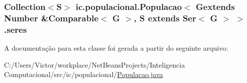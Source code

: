 \hypertarget{classic_1_1populacional_1_1_populacao_3_01_gextends_01_number_01_6_comparable_3_01_g_01_4_00_01_439c3806f66bccf03e2d51ecb538a0c8_a22fc0aa8b35d6a308cce0a87130cb9b0}{
\subsubsection[{seres}]{\setlength{\rightskip}{0pt plus 5cm}Collection$<$S$>$ ic.\-populacional.\-Populacao$<$ Gextends Number \&Comparable$<$ G $>$, S extends Ser$<$ G $>$ $>$.seres\hspace{0.3cm}{\ttfamily [protected]}}}\label{classic_1_1populacional_1_1_populacao_3_01_gextends_01_number_01_6_comparable_3_01_g_01_4_00_01_439c3806f66bccf03e2d51ecb538a0c8_a22fc0aa8b35d6a308cce0a87130cb9b0}


A documentação para esta classe foi gerada a partir do seguinte arquivo\-:\begin{DoxyCompactItemize}
\item 
C\-:/\-Users/\-Victor/workplace/\-Net\-Beans\-Projects/\-Inteligencia Computacional/src/ic/populacional/\hyperlink{_populacao_8java}{Populacao.\-java}\end{DoxyCompactItemize}

